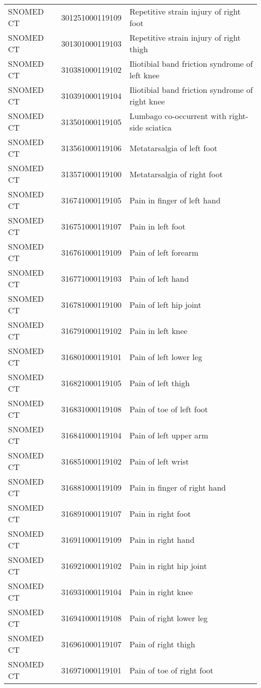 \begin{longtable}{p{}p{}p{}}
  SNOMED CT & 301251000119109 & Repetitive strain injury of right foot \\ 
  SNOMED CT & 301301000119103 & Repetitive strain injury of right thigh \\ 
  SNOMED CT & 310381000119102 & Iliotibial band friction syndrome of left knee \\ 
  SNOMED CT & 310391000119104 & Iliotibial band friction syndrome of right knee \\ 
  SNOMED CT & 313501000119105 & Lumbago co-occurrent with right-side sciatica \\ 
  SNOMED CT & 313561000119106 & Metatarsalgia of left foot \\ 
  SNOMED CT & 313571000119100 & Metatarsalgia of right foot \\ 
  SNOMED CT & 316741000119105 & Pain in finger of left hand \\ 
  SNOMED CT & 316751000119107 & Pain in left foot \\ 
  SNOMED CT & 316761000119109 & Pain of left forearm \\ 
  SNOMED CT & 316771000119103 & Pain of left hand \\ 
  SNOMED CT & 316781000119100 & Pain of left hip joint \\ 
  SNOMED CT & 316791000119102 & Pain in left knee \\ 
  SNOMED CT & 316801000119101 & Pain of left lower leg \\ 
  SNOMED CT & 316821000119105 & Pain of left thigh \\ 
  SNOMED CT & 316831000119108 & Pain of toe of left foot \\ 
  SNOMED CT & 316841000119104 & Pain of left upper arm \\ 
  SNOMED CT & 316851000119102 & Pain of left wrist \\ 
  SNOMED CT & 316881000119109 & Pain in finger of right hand \\ 
  SNOMED CT & 316891000119107 & Pain in right foot \\ 
  SNOMED CT & 316911000119109 & Pain in right hand \\ 
  SNOMED CT & 316921000119102 & Pain in right hip joint \\ 
  SNOMED CT & 316931000119104 & Pain in right knee \\ 
  SNOMED CT & 316941000119108 & Pain of right lower leg \\ 
  SNOMED CT & 316961000119107 & Pain of right thigh \\ 
  SNOMED CT & 316971000119101 & Pain of toe of right foot \\ 

\end{longtable}
